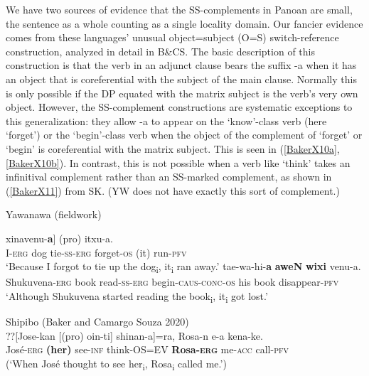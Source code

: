 \documentclass[output=paper,colorlinks,citecolor=brown,
]{langscibook}
\renewcommand{\sc}[1]{\textsc{#1}}
\begin{document}
We have two sources of evidence that the SS-complements in Panoan are small, the sentence as a whole counting as a single locality domain. Our fancier evidence comes from these languages’ unusual object=subject (O=S) switch-reference construction, analyzed in detail in B\&CS. The basic description of this construction is that the verb in an adjunct clause bears the suffix -a when it has an object that is coreferential with the subject of the main clause. Normally this is only possible if the DP equated with the matrix subject is the verb’s very own object. However, the SS-complement constructions are systematic exceptions to this generalization: they allow -a to appear on the ‘know’-class verb (here ‘forget’) or the ‘begin’-class verb when the object of the complement of ‘forget’ or ‘begin’ is coreferential with the matrix subject. This is seen in (\ref{BakerX10a},\ref{BakerX10b}). In contrast, this is not possible when a verb like ‘think’ takes an infinitival complement rather than an SS-marked complement, as shown in (\ref{BakerX11}) from SK. (YW does not have exactly this sort of complement.)

\begin{exe}
    \ex Yawanawa (fieldwork) \label{BakerX10}
        \begin{xlist}
        \ex \label{BakerX10a}
			\gll [E-N [\textbf{kaNmaN} nesha-ki-N] xinavenu-\textbf{a}] (pro) itxu-a.\\
			     I-\sc{erg} dog tie-\sc{ss-erg} forget-\sc{os} (it) run-\sc{pfv}\\
			    \glt `Because I forgot to tie up the dog\textsubscript{i}, it\textsubscript{i} ran away.'
		\ex \label{BakerX10b}
			\gll [Shukuvena-N [\textbf{wixi} ane-ki-N] tae-wa-hi-\textbf{a} \textbf{aweN} \textbf{wixi} venu-a.\\
    			 Shukuvena-\sc{erg} book read-\sc{ss-erg} begin-\sc{caus-conc-os} his book disappear-\sc{pfv}\\
			    \glt `Although Shukuvena started reading the book\textsubscript{i}, it\textsubscript{i} got lost.'
        \end{xlist}
\end{exe}

\begin{exe}
    \ex Shipibo (Baker and Camargo Souza 2020) \label{BakerX11}\\
        \gll ??[Jose-kan [(pro) oin-ti] shinan-a]=ra, Rosa-n e-a kena-ke.\\
            José-\sc{erg} \textbf{(her)} see-\sc{inf} think-\sc{OS=EV} \textbf{Rosa-\sc{erg}} me-\sc{acc} call-\sc{pfv}\\
        \glt (`When José thought to see her\textsubscript{i}, Rosa\textsubscript{i} called me.')
\end{exe}
\end{document}

